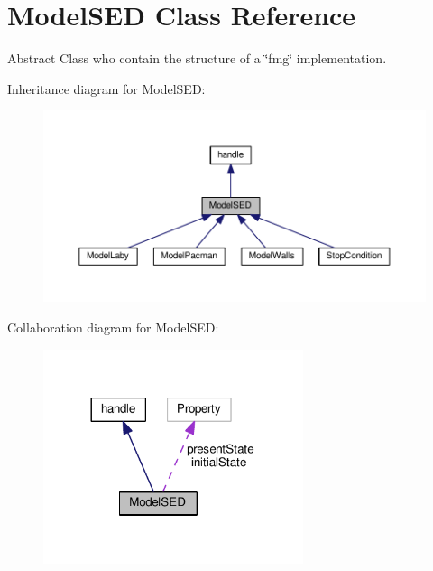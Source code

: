 \hypertarget{class_model_s_e_d}{}\section{Model\+S\+ED Class Reference}
\label{class_model_s_e_d}


Abstract Class who contain the structure of a \char`\"{}fmg\char`\"{} implementation.  




Inheritance diagram for Model\+S\+ED\+:
\nopagebreak
\begin{figure}[H]
\begin{center}
\leavevmode
\includegraphics[width=350pt]{class_model_s_e_d__inherit__graph}
\end{center}
\end{figure}


Collaboration diagram for Model\+S\+ED\+:\nopagebreak
\begin{figure}[H]
\begin{center}
\leavevmode
\includegraphics[width=216pt]{class_model_s_e_d__coll__graph}
\end{center}
\end{figure}
